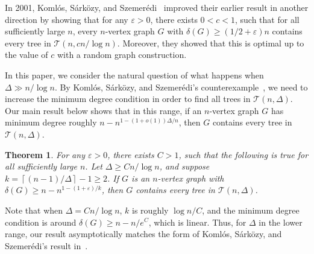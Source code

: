 \documentclass{article}
\theoremstyle{plain}
\newtheorem{theorem}{Theorem}[section]
\theoremstyle{definition}
\numberwithin{equation}{section}
\def\eps{\varepsilon}
\newcommand\ceil[1]{\left\lceil#1\right\rceil}
\newcommand\cT{\mathcal{T}}
\begin{document}
In 2001, Koml\'os, S\'ark\"ozy, and Szemer\'edi~{\cite[Theorem 1.2]{KSS2}} improved their earlier result in another direction by showing that for any $\eps>0$, there exists $0<c<1$, such that for all sufficiently large $n$, every $n$-vertex graph $G$ with $\delta(G)\geq(1/2+\eps)n$ contains every tree in $\cT(n,cn/\log n)$. Moreover, they showed that this is optimal up to the value of $c$ with a random graph construction. %

In this paper, we consider the natural question of what happens when $\Delta\gg n/\log n$. By Koml\'os, S\'ark\"ozy, and Szemer\'edi's counterexample~\cite{KSS2}, we need to increase the minimum degree condition in order to find all trees in $\cT(n,\Delta)$. Our main result below shows that in this range, %
if an $n$-vertex graph $G$ has minimum degree roughly $n-n^{1-(1+o(1))\Delta/n}$, then $G$ contains every tree in $\cT(n,\Delta)$. 

\begin{theorem}\label{thm:main}
For any $\eps>0$, there exists $C>1$, such that the following is true for all sufficiently large $n$. Let $\Delta\geq Cn/\log n$, and suppose $k=\ceil{(n-1)/\Delta}-1\geq2$. If $G$ is an $n$-vertex graph with $\delta(G)\geq n-n^{1-(1+\eps)/k}$, then $G$ contains every tree in $\cT(n,\Delta)$.
\end{theorem}

Note that when $\Delta=Cn/\log n$, $k$ is roughly $\log n/C$, and the minimum degree condition is around $\delta(G)\geq n-n/e^C$, which is linear. Thus, for $\Delta$ in the lower range, our result asymptotically matches the form of Koml\'os, S\'ark\"ozy, and Szemer\'edi's result in~\cite{KSS2}. %

\end{document}
